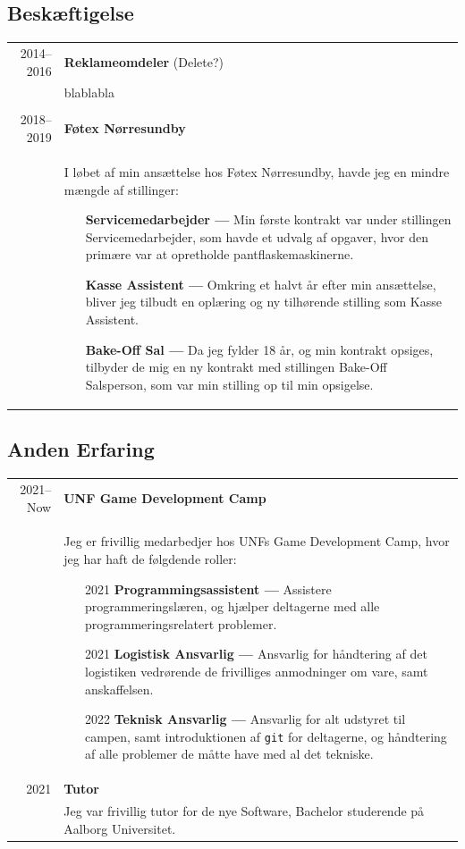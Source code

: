 \documentclass{article}
\begin{document}
    \subsection*{Beskæftigelse}
    \begin{tabular}{r|p{.82\linewidth}}%
        2014--2016 & \textbf{Reklameomdeler} (Delete?)\\
    &   blablabla
        \\\\
        2018--2019 & \textbf{Føtex Nørresundby}\\
    &   I løbet af min ansættelse hos Føtex Nørresundby, havde jeg en mindre mængde af stillinger:
        \begin{itemize}\setlength\itemsep{0em}
            \item[] \textbf{Servicemedarbejder --- } Min første kontrakt var under stillingen 
                Servicemedarbejder, som havde et udvalg af opgaver, hvor den primære var at
                opretholde pantflaskemaskinerne.
            \item[] \textbf{Kasse Assistent --- } Omkring et halvt år efter min ansættelse, bliver
                jeg tilbudt en oplæring og ny tilhørende stilling som Kasse Assistent.
            \item[] \textbf{Bake-Off Sal --- } Da jeg fylder 18 år, og min kontrakt opsiges,
                tilbyder de mig en ny kontrakt med stillingen Bake-Off Salsperson, som var min stilling
                op til min opsigelse.
        \end{itemize}
    \end{tabular}

    \subsection*{Anden Erfaring}
    \begin{tabular}{r|p{.82\linewidth}}
        2021--Now & \textbf{UNF Game Development Camp}\\
    &   Jeg er frivillig medarbedjer hos UNFs Game Development Camp, hvor jeg har haft de følgdende roller:
        \begin{itemize}\setlength\itemsep{0em}
            \item[2021] \textbf{Programmingsassistent ---} Assistere programmeringslæren, og hjælper
                deltagerne med alle programmeringsrelatert problemer.
            \item[2021] \textbf{Logistisk Ansvarlig ---} Ansvarlig for håndtering af det logistiken
                vedrørende de frivilliges anmodninger om vare, samt anskaffelsen.
            \item[2022] \textbf{Teknisk Ansvarlig ---} Ansvarlig for alt udstyret til campen, samt
                introduktionen af \verb|git| for deltagerne, og håndtering af alle problemer de
                måtte have med al det tekniske.
        \end{itemize}
        \\
        2021 & \textbf{Tutor}\\
    &   Jeg var frivillig tutor for de nye Software, Bachelor studerende på Aalborg Universitet.
    \end{tabular}
\end{document}

